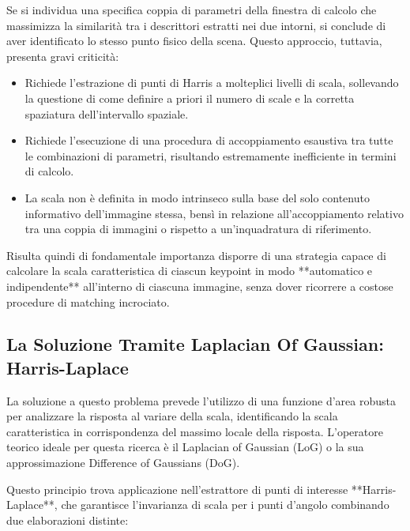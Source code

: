 ﻿\documentclass[11pt, a4paper]{article}
\begin{document}

Se si individua una specifica coppia di parametri della finestra di calcolo che massimizza la similarità tra i descrittori estratti nei due intorni, si conclude di aver identificato lo stesso punto fisico della scena. Questo approccio, tuttavia, presenta gravi criticità:
\begin{itemize}
    \item Richiede l'estrazione di punti di Harris a molteplici livelli di scala, sollevando la questione di come definire a priori il numero di scale e la corretta spaziatura dell'intervallo spaziale.
    \item Richiede l'esecuzione di una procedura di accoppiamento esaustiva tra tutte le combinazioni di parametri, risultando estremamente inefficiente in termini di calcolo.
    \item La scala non è definita in modo intrinseco sulla base del solo contenuto informativo dell'immagine stessa, bensì in relazione all'accoppiamento relativo tra una coppia di immagini o rispetto a un'inquadratura di riferimento.
\end{itemize}

Risulta quindi di fondamentale importanza disporre di una strategia capace di calcolare la scala caratteristica di ciascun keypoint in modo **automatico e indipendente** all'interno di ciascuna immagine, senza dover ricorrere a costose procedure di matching incrociato.

\subsection{La Soluzione Tramite Laplacian Of Gaussian: Harris-Laplace}

La soluzione a questo problema prevede l'utilizzo di una funzione d'area robusta per analizzare la risposta al variare della scala, identificando la scala caratteristica in corrispondenza del massimo locale della risposta. L'operatore teorico ideale per questa ricerca è il Laplacian of Gaussian (LoG) o la sua approssimazione Difference of Gaussians (DoG).


Questo principio trova applicazione nell'estrattore di punti di interesse **Harris-Laplace**, che garantisce l'invarianza di scala per i punti d'angolo combinando due elaborazioni distinte:
\end{document}
